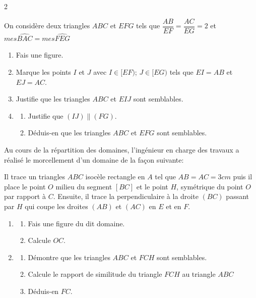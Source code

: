 \begin{multicols}{2}
  	
  	On considère deux triangles $ABC$ et $EFG$ tels que $\dfrac{AB}{EF}=\dfrac{AC}{EG}=2$ et $mes\widehat{BAC}=mes\widehat{FEG}$
  	\begin{enumerate} 
  		\item Fais une figure.
  		\item Marque les points $I$ et $J$ avec $I\in[EF)$; $J\in[EG)$ tels que $EI=AB$ et $EJ=AC$.
  		\item Justifie que les triangles $ABC$ et $EIJ$ sont  semblables.
  		\item 
  		\begin{enumerate} 	
  			\item  Justifie que $(IJ)\parallel(FG)$.
  			\item Déduis-en que les triangles $ABC$ et $EFG$ sont  semblables.
  		\end{enumerate}
  	\end{enumerate}
  	\dures
  	 
 
  	
  	\hspace{0.4cm}Au cours de la répartition des domaines, l'ingénieur en charge des travaux a réalisé le morcellement d'un domaine de la façon suivante:
  	
  	Il trace un triangles $ABC$ isocèle rectangle en $A$ tel que $AB=AC=3 cm$ puis il place le point $O$ milieu du segment $[BC]$ et le point $H$, symétrique du point $O$ par rapport à $C$. Ensuite, il trace la perpendiculaire à la droite $(BC)$ passant par $H$  qui coupe les droites $(AB)$ et  $(AC)$ en $E$ et en $F$.
  	\begin{enumerate} 	
  		\item 
  		\begin{enumerate}
  			\item  Fais une figure du dit domaine.
  			\item Calcule $OC$.
  		\end{enumerate}
  		\item 
  		\begin{enumerate}
  			\item  Démontre que les triangles $ABC$ et $FCH$ sont semblables.
  			\item  Calcule le rapport de similitude du triangle $FCH$ au triangle $ABC$
  			\item  Déduis-en $FC$. 
  		\end{enumerate}
  	\end{enumerate}
  	\dures
  	 

\end{multicols}
